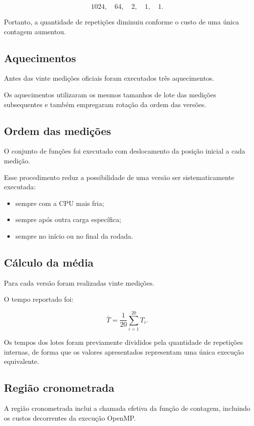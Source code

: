 \[
1024,\quad64,\quad2,\quad1,\quad1.
\]

Portanto, a quantidade de repetições diminuiu conforme o custo de uma única
contagem aumentou.


\subsection{Aquecimentos}

Antes das vinte medições oficiais foram executados três aquecimentos.

Os aquecimentos utilizaram os mesmos tamanhos de lote das medições
subsequentes e também empregaram rotação da ordem das versões.


\subsection{Ordem das medições}

O conjunto de funções foi executado com deslocamento da posição inicial a
cada medição.

Esse procedimento reduz a possibilidade de uma versão ser sistematicamente
executada:

\begin{itemize}
    \item sempre com a CPU mais fria;
    \item sempre após outra carga específica;
    \item sempre no início ou no final da rodada.
\end{itemize}


\subsection{Cálculo da média}

Para cada versão foram realizadas vinte medições.

O tempo reportado foi:

\[
\bar T =
\frac{1}{20}
\sum_{i=1}^{20}T_i.
\]

Os tempos dos lotes foram previamente divididos pela quantidade de
repetições internas, de forma que os valores apresentados representam uma
única execução equivalente.


\subsection{Região cronometrada}

A região cronometrada inclui a chamada efetiva da função de contagem,
incluindo os custos decorrentes da execução OpenMP.


